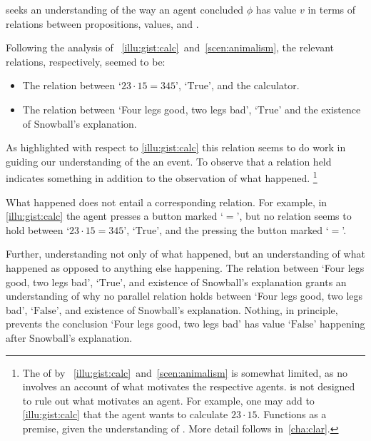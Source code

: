\begin{note}
  \qWhy{} seeks an understanding of the way an agent concluded \(\phi\) has value \(v\) in terms of relations between propositions, values, and .

  Following the analysis of ~\ref{illu:gist:calc}~and~\ref{scen:animalism}, the relevant relations, respectively, seemed to be:

  \begin{itemize}[noitemsep]
  \item
    The relation between `\(23 \cdot 15 = 345\)', `\(\text{True}\)', and the calculator.
  \item
    The relation between `Four legs good, two legs bad', `\(\text{True}\)' and the existence of Snowball's explanation.
  \end{itemize}

  As highlighted with respect to \autoref{illu:gist:calc} this relation seems to do work in guiding our understanding of the an event.
  To observe that a relation held indicates something in addition to the observation of what happened.%
  \footnote{
    The  of \qWhy{} by ~\ref{illu:gist:calc}~and~\ref{scen:animalism} is somewhat limited, as no  involves an account of what motivates the respective agents.
    \qWhy{} is not designed to rule out what motivates an agent.
    For example, one may add to \autoref{illu:gist:calc} that the agent wants to calculate \(23 \cdot 15\).
    Functions as a premise, given the understanding of .
    More detail follows in~\autoref{cha:clar}.
  }

  What happened does not entail a corresponding relation.
  For example, in \autoref{illu:gist:calc} the agent presses a button marked `\(=\)', but no relation seems to hold between `\(23 \cdot 15 = 345\)', `\(\text{True}\)', and the pressing the button marked `\(=\)'.

  Further, understanding not only of what happened, but an understanding of what happened as opposed to anything else happening.
  The relation between `Four legs good, two legs bad', `\(\text{True}\)', and existence of Snowball's explanation grants an understanding of why no parallel relation holds between `Four legs good, two legs bad', `\(\text{False}\)', and existence of Snowball's explanation.
  Nothing, in principle, prevents the conclusion `Four legs good, two legs bad' has value `\(\text{False}\)' happening after Snowball's explanation.
\end{note}

